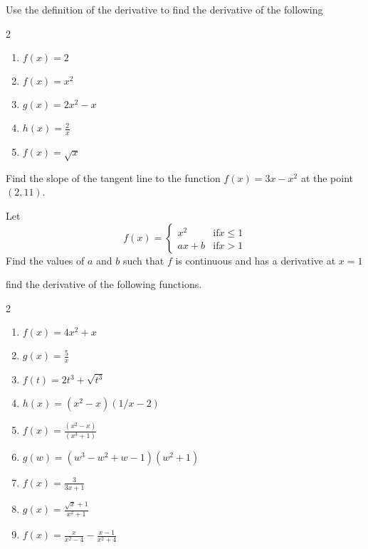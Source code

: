 \documentclass[12pt,letterpaper]{article}
\newenvironment{problem}[2][Problem]{\begin{trivlist}
\item[\hskip \labelsep {\bfseries #1}\hskip \labelsep {\bfseries #2.}]}{\end{trivlist}}
\newenvironment{sol}
    {\emph{Solution:}
    }
    {
    \qed
    }
\begin{document}



\begin{problem}{1}
  Use the definition of the derivative to find the derivative of the following
\begin{multicols}{2}
  \begin{enumerate}[label=\roman*)]
  \item $f(x) = 2$
  \item $f(x)=x^2$
  \item $g(x)=2x^2 - x$
  \item $\displaystyle h(x) = \frac{2}{x}$
  \item $\displaystyle f(x) = \sqrt{x}$
  \end{enumerate}
\end{multicols}
\end{problem}


\begin{problem}{2}
  Find the slope of the tangent line to the function $f(x)=3x-x^2$ at the point $(2,11)$.
\end{problem}
\vfill

\begin{problem}{3}
  Let
  $$
  f(x)=\begin{cases} x^2 & \text{if} x\leq 1\\
  ax+b & \text{if} x > 1
  \end{cases}
  $$
  Find the values of $a$ and $b$ such that $f$ is continuous and has a derivative at $x=1$
\vfill
\end{problem}

\begin{problem}{4}
  find the derivative of the following functions.
\begin{multicols}{2}
  \begin{enumerate}[label=\roman*)]
  \item $f(x) = 4x^2 + x$
  \item $\displaystyle g(x)=\frac{5}{x}$
  \item $f(t) = 2t^3+\sqrt{t^3}$
  \item $ h(x) = (x^2-x)(1/x-2)$
  \item $f(x) = \frac{(x^2-x)}{(x^3+1)}$
  \item $g(w) = (w^3-w^2+w-1)(w^2+1) $
  \item $f(x) = \displaystyle\frac{3}{3x+1}$
  \item $g(x) = \displaystyle\frac{\sqrt{x}+1}{x^2+1}$
    \item $f(x) = \displaystyle\frac{x}{x^2-4}-\frac{x-1}{x^2+4}$
  \end{enumerate}
\end{multicols}
\end{problem}
\end{document}
